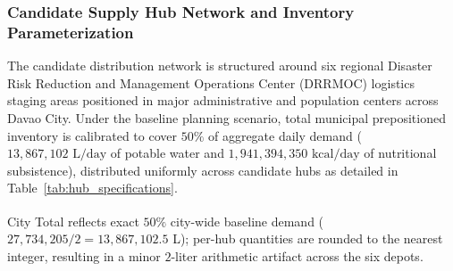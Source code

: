 \subsubsection{Candidate Supply Hub Network and Inventory Parameterization}
The candidate distribution network is structured around six regional Disaster Risk Reduction and Management Operations Center (DRRMOC) logistics staging areas positioned in major administrative and population centers across Davao City. Under the baseline planning scenario, total municipal prepositioned inventory is calibrated to cover $50\%$ of aggregate daily demand ($13{,}867{,}102\text{ L/day}$ of potable water and $1{,}941{,}394{,}350\text{ kcal/day}$ of nutritional subsistence), distributed uniformly across candidate hubs as detailed in Table~\ref{tab:hub_specifications}.

\begin{table}[H]
\centering
\caption{Candidate DRRMOC Distribution Hub Specifications and Available Stock}
\label{tab:hub_specifications}
\small
{}
\vspace{0.1cm}
\footnotesize{\newline \textsuperscript{\textdagger}City Total reflects exact $50\%$ city-wide baseline demand ($27{,}734{,}205 / 2 = 13{,}867{,}102.5$ L); per-hub quantities are rounded to the nearest integer, resulting in a minor $2$-liter arithmetic artifact across the six depots.}
\end{table}

